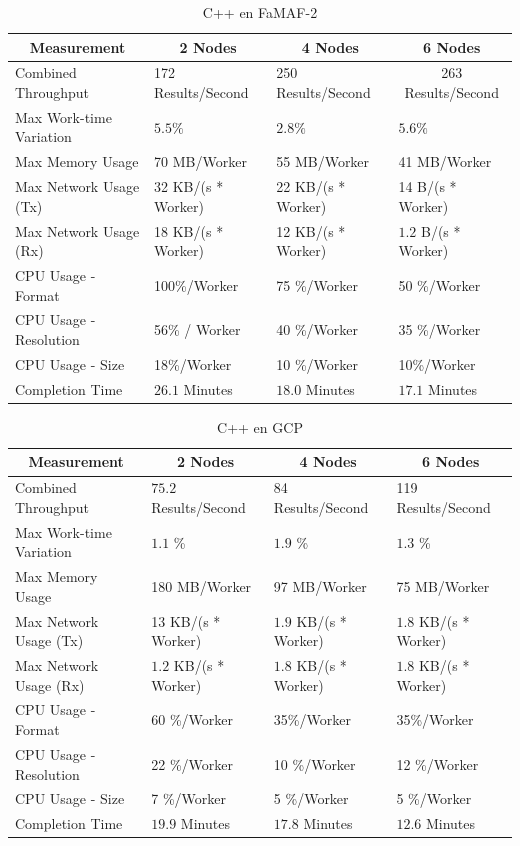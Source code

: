 \documentclass[11pt]{article}
\begin{document}
\begin{table}[H]
\centering
\begin{tabular}{|l|l|l|l|}
\hline
\multicolumn{1}{|c|}{Measurement} & \multicolumn{1}{c|}{2 Nodes} & \multicolumn{1}{c|}{4 Nodes} & \multicolumn{1}{c|}{6 Nodes} \\ \hline
Combined Throughput & 172 Results/Second & 250 Results/Second & \multicolumn{1}{c|}{263 Results/Second} \\ \hline
Max Work-time Variation & $5.5\%$& $2.8\%$& $5.6\%$\\ \hline
Max Memory Usage & 70 MB/Worker & 55 MB/Worker & 41 MB/Worker \\ \hline
Max Network Usage (Tx) & 32 KB/(s * Worker) & 22 KB/(s * Worker) & 14 B/(s * Worker) \\ \hline
Max Network Usage (Rx) & 18 KB/(s * Worker) & 12 KB/(s * Worker) & $1.2$ B/(s * Worker) \\ \hline
CPU Usage - Format & 100\%/Worker & 75 \%/Worker & 50 \%/Worker \\ \hline
CPU Usage - Resolution & 56\% / Worker & 40 \%/Worker & 35 \%/Worker \\ \hline
CPU Usage - Size & 18\%/Worker & 10 \%/Worker & 10\%/Worker \\ \hline
Completion Time & $26.1$ Minutes & $18.0$ Minutes & $17.1$ Minutes \\ \hline
\end{tabular}
\caption{C++ en FaMAF-2}
\end{table}

\begin{table}[H]
\centering
\begin{tabular}{|l|l|l|l|}
\hline
\multicolumn{1}{|c|}{Measurement} & \multicolumn{1}{c|}{2 Nodes} & \multicolumn{1}{c|}{4 Nodes} & \multicolumn{1}{c|}{6 Nodes} \\ \hline
Combined Throughput & $75.2$ Results/Second & 84 Results/Second & 119 Results/Second \\ \hline
Max Work-time Variation & $1.1$ \% & $1.9$ \% & $1.3$ \% \\ \hline
Max Memory Usage & 180 MB/Worker & 97 MB/Worker & 75 MB/Worker \\ \hline
Max Network Usage (Tx) & 13 KB/(s * Worker) & $1.9$ KB/(s * Worker) & $1.8$ KB/(s * Worker) \\ \hline
Max Network Usage (Rx) & $1.2$ KB/(s * Worker) & $1.8$ KB/(s * Worker) & $1.8$ KB/(s * Worker) \\ \hline
CPU Usage - Format & 60 \%/Worker & 35\%/Worker & 35\%/Worker \\ \hline
CPU Usage - Resolution & 22 \%/Worker & 10 \%/Worker & 12 \%/Worker \\ \hline
CPU Usage - Size & 7 \%/Worker & 5 \%/Worker & 5 \%/Worker \\ \hline
Completion Time & $19.9$ Minutes & $17.8$ Minutes & $12.6$ Minutes \\ \hline
\end{tabular}
\caption{C++ en GCP}
\end{table}
\end{document}
